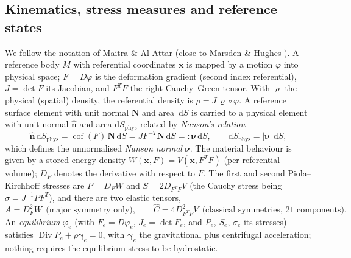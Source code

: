 \documentclass[11pt]{article}
\numberwithin{equation}{section}
\theoremstyle{remark}
\newcommand{\dS}{\,\mathrm{d}S}
\newcommand{\cof}{\operatorname{cof}}
\newcommand{\Div}{\operatorname{Div}}
\newcommand{\vn}{\hat{\mathbf{n}}}
\newcommand{\vN}{\mathbf{N}}
\newcommand{\vx}{\mathbf{x}}
\newcommand{\bnu}{\bm{\nu}}
\newcommand{\Ch}{\hat{C}}
\begin{document}
\subsection{Kinematics, stress measures and reference states}
\label{sec:refstate}

We follow the notation of Maitra \& Al-Attar \cite{MaitraAlAttar2021}
(close to Marsden \& Hughes \cite{MarsdenHughes}). A reference body $M$
with referential coordinates $\vx$ is mapped by a motion $\varphi$ into
physical space; $F = D\varphi$ is the deformation gradient (second index
referential), $J = \det F$ its Jacobian, and $F^TF$ the right
Cauchy--Green tensor. With $\varrho$ the physical (spatial) density, the
referential density is $\rho = J\,\varrho\circ\varphi$. A reference
surface element with unit normal $\vN$ and area $\dS$ is carried to a
physical element with unit normal $\vn$ and area $\mathrm{d}S_{\mathrm{phys}}$
related by \emph{Nanson's relation}
\begin{equation}
  \vn\,\mathrm{d}S_{\mathrm{phys}} = \cof(F)\,\vN\dS = J F^{-T}\vN\dS
  =: \bnu\dS, \qquad \mathrm{d}S_{\mathrm{phys}} = |\bnu|\dS,
  \label{eq:nanson0}
\end{equation}
which defines the unnormalised \emph{Nanson normal} $\bnu$. The material
behaviour is given by a stored-energy density $W(\vx,F) = V(\vx,F^TF)$
(per referential volume); $D_F$ denotes the derivative with respect to
$F$. The first and second Piola--Kirchhoff stresses are $P = D_F W$ and
$S = 2 D_{F^TF} V$ (the Cauchy stress being $\sigma = J^{-1}PF^T$), and
there are two elastic tensors,
\begin{equation}
  A = D_F^2 W \ \ \text{(major symmetry only)}, \qquad
  \Ch = 4 D_{F^TF}^2 V \ \ \text{(classical symmetries, 21 components)} .
\end{equation}
An \emph{equilibrium} $\varphi_e$ (with $F_e = D\varphi_e$,
$J_e = \det F_e$, and $P_e$, $S_e$, $\sigma_e$ its stresses) satisfies
$\Div P_e + \rho\bm{\gamma}_e = 0$, with $\bm{\gamma}_e$ the gravitational
plus centrifugal acceleration; nothing requires the equilibrium stress to
be hydrostatic.
\end{document}
